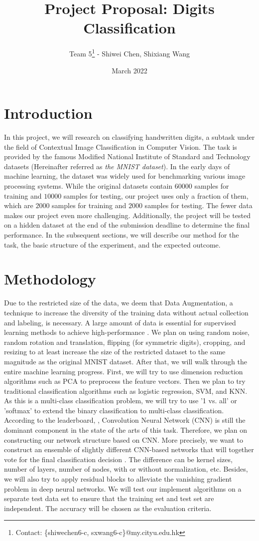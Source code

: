\documentclass{article}
\title{Project Proposal: Digits Classification}
\author{Team 5\footnote{Contact: \{shiwechen6-c, sxwang6-c\}@my.cityu.edu.hk}  \:- Shiwei Chen, Shixiang Wang}
\date{March 2022}
\begin{document}
\maketitle

\section{Introduction}
 In this project, we will research on classifying handwritten digits, a subtask under the field of Contextual Image Classification in Computer Vision. The task is provided by the famous Modified National Institute of Standard and Technology datasets \cite{ref1} (Hereinafter referred as \textit{the MNIST dataset}). In the early days of machine learning, the dataset was widely used for benchmarking various image processing systems. While the original datasets contain $60000$ samples for training and $10000$ samples for testing, our project uses only a fraction of them, which are $2000$ samples for training and $2000$ samples for testing. The fewer data makes our project even more challenging. Additionally, the project will be tested on a hidden dataset at the end of the submission deadline to determine the final performance. In the subsequent sections, we will describe our method for the task, the basic structure of the experiment, and the expected outcome.

\section{Methodology}
 Due to the restricted size of the data, we deem that Data Augmentation, a technique to increase the diversity of the training data without actual collection and labeling, is necessary. A large amount of data is essential for supervised learning methods to achieve high-performance \cite{ref2}. We plan on using random noise, random rotation and translation, flipping (for symmetric digits), cropping, and resizing to at least increase the size of the restricted dataset to the same magnitude as the original MNIST dataset. After that, we will walk through the entire machine learning progress. First, we will try to use dimension reduction algorithms such as PCA to preprocess the feature vectors. Then we plan to try traditional classification algorithms such as logistic regression, SVM, and KNN. As this is a multi-class classification problem, we will try to use '1 vs. all' or 'softmax' to extend the binary classification to multi-class classification. According to the leaderboard, \cite{ref3}, Convolution Neural Network (CNN)\cite{ref4} is still the dominant component in the state of the arts of this task. Therefore, we plan on constructing our network structure based on CNN. More precisely, we want to construct an ensemble of slightly different CNN-based networks that will together vote for the final classification decision \cite{ref5}. The difference can be kernel sizes, number of layers, number of nodes, with or without normalization, etc. Besides, we will also try to apply residual blocks to alleviate the vanishing gradient problem in deep neural networks. We will test our implement algorithms on a separate test data set to ensure that the training set and test set are independent. The accuracy will be chosen as the evaluation criteria.
\end{document}
